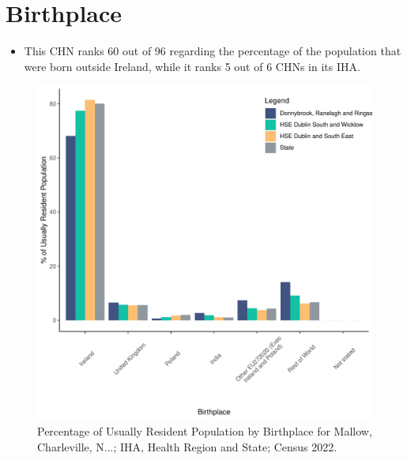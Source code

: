 \documentclass{article}
\begin{document}
\section{Birthplace}\label{sect:Birth}
\begin{itemize}
\item This CHN ranks  60 out of 96 regarding the percentage of the population that were born outside Ireland, while it ranks  5 out of 6 CHNs in its IHA.
\end{itemize}
\begin{figure}[H]
	\centering
	\includegraphics[width = 130mm]{../figures/BirthED.pdf}
	\caption{Percentage of Usually Resident Population by Birthplace for Mallow, Charleville, N...; IHA, Health Region and State; Census 2022.}
	\label{fig:vbnv}
	\end{figure}
	
\end{document}
